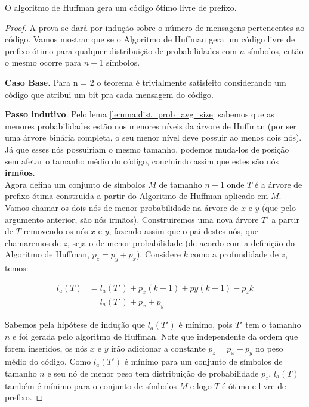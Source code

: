 \begin{theorem} O algoritmo de Huffman gera um código ótimo livre de prefixo.
\begin{proof}
A prova se dará por indução sobre o número de mensagens pertencentes ao código. 
Vamos mostrar que se o Algoritmo de Huffman gera um código livre de prefixo ótimo para qualquer distribuição de probabilidades com $n$ símbolos, então o mesmo ocorre para $n + 1$ símbolos.

\item \textbf{Caso Base.} Para n = 2 o teorema é trivialmente satisfeito considerando um código que atribui um bit pra cada mensagem do código.

\item \textbf{Passo indutivo}. Pelo lema \ref{lemma:dist_prob_avg_size} sabemos que as menores probabilidades estão nos menores níveis da árvore de Huffman (por ser uma árvore binária completa, o seu menor nível deve possuir ao menos dois nós). 
Já que esses nós possuiriam o mesmo tamanho, podemos muda-los de posição sem afetar o tamanho médio do código, concluindo assim que estes são nós \textbf{irmãos}.\\
Agora defina um conjunto de símbolos $M$ de tamanho $n + 1$ onde $T$ é a árvore de prefixo ótima construída a partir do Algoritmo de Huffman aplicado em $M$.
Vamos chamar os dois nós de menor probabilidade na árvore de $x$ e $y$ (que pelo argumento anterior, são nós irmãos). 
Construiremos uma nova árvore $T'$ a partir de $T$ removendo os nós $x$ e $y$, fazendo assim que o pai destes nós, que chamaremos de $z$, seja o de menor probabilidade (de acordo com a definição do Algoritmo de Huffman, $p_z = p_y + p_x$).
 Considere $k$ como a profundidade de $z$, temos:

\begin{align*}
l_a(T) &= l_a(T') + p_x(k + 1) + py(k + 1) - p_z k \\
&= l_a(T') + p_x + p_y
\end{align*}

Sabemos pela hipótese de indução que $l_a(T')$ é mínimo, pois $T'$ tem o tamanho $n$ e foi gerada pelo algoritmo de Huffman. 
Note que independente da ordem que forem inseridos, os nós $x$ e $y$ irão adicionar a constante $p_z = p_x + p_y$ no peso médio do código. 
Como $l_a(T')$ é mínimo para um conjunto de símbolos de tamanho $n$ e seu nó de menor peso tem distribuição de probabilidade $p_z$, $l_a(T)$ também é mínimo para o conjunto de símbolos $M$ e logo $T$ é ótimo e livre de prefixo. 
\end{proof}
\end{theorem}

